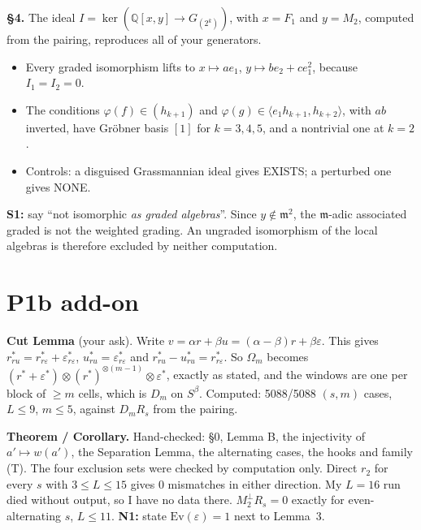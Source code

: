 \documentclass[11pt]{article}
\begin{document}
\textbf{\S4.} The ideal $I=\ker(\mathbb{Q}[x,y]\to G_{(2^k)})$, with $x=F_1$ and $y=M_2$, computed from the pairing, reproduces all of your generators.
\begin{itemize}[nosep]
\item Every graded isomorphism lifts to $x\mapsto ae_1$, $y\mapsto be_2+ce_1^2$, because $I_1=I_2=0$.
\item The conditions $\varphi(f)\in(h_{k+1})$ and $\varphi(g)\in\langle e_1h_{k+1},h_{k+2}\rangle$, with $ab$ inverted, have Gr\"obner basis $[1]$ for $k=3,4,5$, and a nontrivial one at $k=2$.
\item Controls: a disguised Grassmannian ideal gives EXISTS; a perturbed one gives NONE.
\end{itemize}
\textbf{S1:} say ``not isomorphic \emph{as graded algebras}''. Since $y\notin\mathfrak m^2$, the $\mathfrak m$-adic associated graded is not the weighted grading. An ungraded isomorphism of the local algebras is therefore excluded by neither computation.

\section{P1b add-on}
\textbf{Cut Lemma} (your ask). Write $v=\alpha r+\beta u=(\alpha-\beta)r+\beta\varepsilon$. This gives $r^*_{ru}=r^*_{r\varepsilon}+\varepsilon^*_{r\varepsilon}$, $u^*_{ru}=\varepsilon^*_{r\varepsilon}$ and $r^*_{ru}-u^*_{ru}=r^*_{r\varepsilon}$. So $\Omega_m$ becomes $(r^*+\varepsilon^*)\otimes(r^*)^{\otimes(m-1)}\otimes\varepsilon^*$, exactly as stated, and the windows are one per block of $\ge m$ cells, which is $D_m$ on $S^\beta$.\checkmark{}
Computed: 5088/5088 $(s,m)$ cases, $L\le9$, $m\le5$, against $D_mR_s$ from the pairing.

\textbf{Theorem / Corollary.} Hand-checked: \S0, Lemma B, the injectivity of $a'\mapsto w(a')$, the Separation Lemma, the alternating cases, the hooks and family (T). The four exclusion sets were checked by computation only. Direct $r_2$ for every $s$ with $3\le L\le15$ gives 0 mismatches in either direction. My $L=16$ run died without output, so I have no data there. $M_2^\perp R_s=0$ exactly for even-alternating $s$, $L\le11$.
\textbf{N1:} state $\mathrm{Ev}(\varepsilon)=1$ next to Lemma~3.
\end{document}

